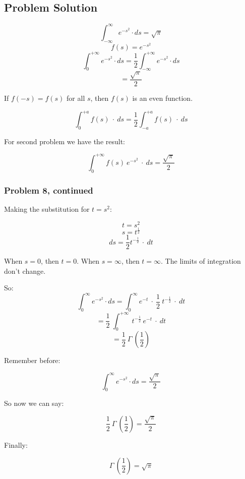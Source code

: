 \documentclass[12pt]{article}
\theoremstyle{definition}
\begin{document}
\subsection*{Problem Solution}

$$ \int_{-\infty}^\infty e^{-s^2} \cdot ds = \sqrt{\pi} $$
$$ f(s) = e^{-s^2} $$
$$ \int_{0}^{+\infty}  e^{-s^2} \cdot ds = \frac{1}{2} \int_{-\infty}^{+\infty} e^{-s^2} \cdot ds$$
$$ = \frac{\sqrt{\pi}}{2} $$

If $f(-s) = f(s)$ for all $s$, then $f(s)$ is an even function.

$$ \int_{0}^{+a} f(s) \ \cdot \ ds = \frac{1}{2} \int_{-a}^{+a} f(s) \ \cdot \ ds $$

For second problem we have the result:

$$ \int_{0}^{+\infty} f(s) \ e^{-s^2} \ \cdot \ ds = \frac{\sqrt{\pi}}{2} $$

\newpage
\subsubsection*{Problem 8, continued}

Making the substitution for $t = s^2$:

$$ t = s^2 $$
$$ s = t^{\frac{1}{2}} $$
$$ ds = \frac{1}{2} t^{-\frac{1}{2}} \ \cdot \ dt $$

When $s = 0$, then $t = 0$.  When $s = \infty$, then  $t = \infty$.  The limits of integration don't change.

So:
$$ \int_{0}^{\infty}  e^{-s^2} \cdot ds = \int_{0}^{\infty} e^{-t} \ \cdot \ \frac{1}{2} \ t^{-\frac{1}{2}} \ \cdot \ dt $$
$$ = \frac{1}{2} \ \int_{0}^{+\infty} \ t^{-\frac{1}{2}} \ e^{-t} \ \cdot \ dt $$
$$ = \frac{1}{2} \ \Gamma \ (\frac{1}{2}) $$

Remember before:

$$ \int_{0}^{\infty}  e^{-s^2} \cdot ds  =  \frac{\sqrt{\pi}}{2} $$

So now we can say:

$$ \frac{1}{2} \ \Gamma \ (\frac{1}{2}) =  \frac{\sqrt{\pi}}{2} $$

Finally:

$$ \Gamma \ (\frac{1}{2}) = \sqrt{\pi}$$
\end{document}

